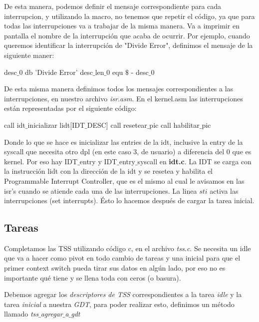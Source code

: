 De esta manera, podemos definir el mensaje correspondiente para cada interrupcion, y utilizando la macro, no tenemos que repetir el c\'odigo, ya que para todas las interrupciones va a trabajar de la misma manera. Va a imprimir en pantalla el nombre de la interrupci\'on que acaba de ocurrir.
Por ejemplo, cuando queremos identificar la interrupci\'on de "Divide Error", definimos el mensaje de la siguiente maner:

\begin{algorithmic}
\State \tab desc$\_$0 db   'Divide Error'
\State \tab desc$\_$len$\_$0 equ     $\$$ - desc$\_$0
\end{algorithmic}

De esta misma manera definimos todos los mensajes correspondientes a las interrupciones, en nuestro archivo \textit{isr.asm}.
\newline
En el kernel.asm las interrupciones están representadas por el siguiente código:
\begin{algorithmic}
\State call idt$\_$inicializar
\State lidt[IDT$\_$DESC]
\State call resetear$\_$pic
\State call habilitar$\_$pic
\end{algorithmic}

Donde lo que se hace es inicializar las entries de la idt, inclusive la entry de la syscall que necesita otro dpl (en este caso 3, de usuario) a diferencia del 0 que es kernel. Por eso hay IDT$\_$entry y IDT$\_$entry$\_$syscall en \textbf{idt.c}. La IDT se carga con la instrucción lidt con la dirección de la idt y se resetea y habilita el Programmable Interrupt Controller, que es el mismo al cual le avisamos en las isr's cuando se atiende cada una de las interrupciones. La linea $sti$ activa las interrupciones (set interrupts). Ésto lo hacemos después de cargar la tarea inicial.
\subsection{Tareas}

Completamos las TSS utilizando c\'odigo c, en el archivo \textit{tss.c}. Se necesita un idle que va a hacer como pivot en todo cambio de tareas y una inicial para que el primer context switch pueda tirar sus datos en algún lado, por eso no es importante qué tiene y se llena toda con ceros (o basura).

Debemos agregar los \textit{descriptores de TSS} correspondientes a la tarea \textit{idle} y la tarea \textit{inicial} a nuestra \textit{GDT}, para poder realizar esto, definimos un m\'etodo llamado \textit{tss$\_$agregar$\_$a$\_$gdt}

